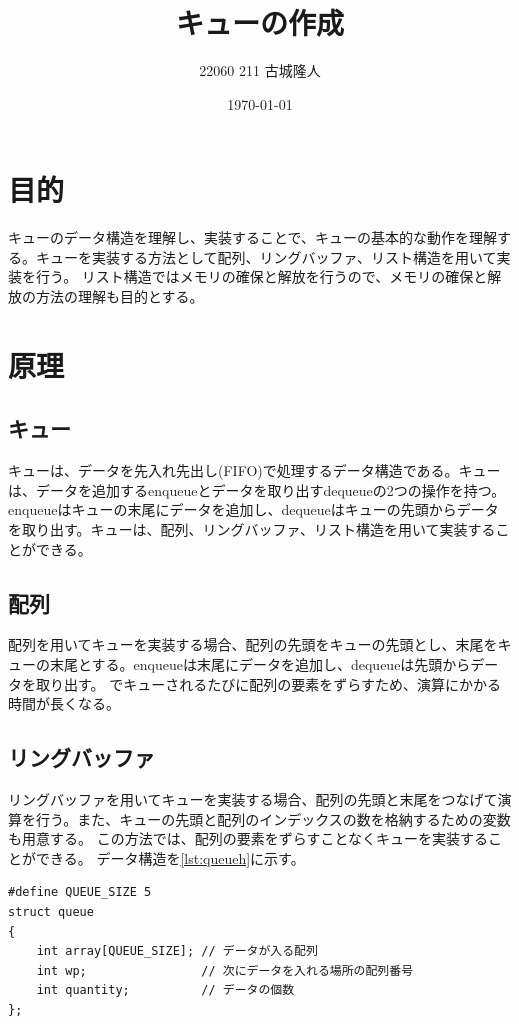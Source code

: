\documentclass[dvipdfmx]{jsarticle}
\begin{document}
\title{キューの作成} 
\author{22060 211 古城隆人}
\date{\today}
\maketitle


\newpage


\section{目的}
キューのデータ構造を理解し、実装することで、キューの基本的な動作を理解する。キューを実装する方法として配列、リングバッファ、リスト構造を用いて実装を行う。
リスト構造ではメモリの確保と解放を行うので、メモリの確保と解放の方法の理解も目的とする。
\section{原理}
\subsection{キュー}
キューは、データを先入れ先出し(FIFO)で処理するデータ構造である。キューは、データを追加するenqueueとデータを取り出すdequeueの2つの操作を持つ。
enqueueはキューの末尾にデータを追加し、dequeueはキューの先頭からデータを取り出す。キューは、配列、リングバッファ、リスト構造を用いて実装することができる。
\subsection{配列}
配列を用いてキューを実装する場合、配列の先頭をキューの先頭とし、末尾をキューの末尾とする。enqueueは末尾にデータを追加し、dequeueは先頭からデータを取り出す。
でキューされるたびに配列の要素をずらすため、演算にかかる時間が長くなる。
\subsection{リングバッファ}
リングバッファを用いてキューを実装する場合、配列の先頭と末尾をつなげて演算を行う。また、キューの先頭と配列のインデックスの数を格納するための変数も用意する。
この方法では、配列の要素をずらすことなくキューを実装することができる。
データ構造を\ref{lst:queueh}に示す。
\begin{lstlisting}[caption={queue.h}, label={lst:queueh}]
#define QUEUE_SIZE 5
struct queue
{
    int array[QUEUE_SIZE]; // データが入る配列
    int wp;                // 次にデータを入れる場所の配列番号
    int quantity;          // データの個数
};
\end{lstlisting}
\end{document}
